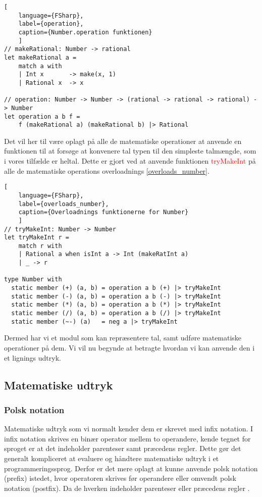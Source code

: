 \begin{lstlisting}[
    language={FSharp},
    label={operation}, 
    caption={Number.operation funktionen}
    ]
// makeRational: Number -> rational
let makeRational a =
    match a with
    | Int x       -> make(x, 1)
    | Rational x  -> x

// operation: Number -> Number -> (rational -> rational -> rational) -> Number
let operation a b f =
    f (makeRational a) (makeRational b) |> Rational
\end{lstlisting}

Det vil her til være oplagt på alle de matematiske operationer at anvende en funktionen til at forsøge at konvenere tal typen til den simpleste talmængde, som i vores tilfælde er heltal. Dette er gjort ved at anvende funktionen \textcolor{red}{tryMakeInt} på alle de matematiske operations overloadnings \ref{overloads_number}.

\begin{lstlisting}[
    language={FSharp},
    label={overloads_number}, 
    caption={Overloadnings funktionerne for Number}
    ]
// tryMakeInt: Number -> Number
let tryMakeInt r =
    match r with
    | Rational a when isInt a -> Int (makeRatInt a)
    | _ -> r
    
type Number with
  static member (+) (a, b) = operation a b (+) |> tryMakeInt
  static member (-) (a, b) = operation a b (-) |> tryMakeInt
  static member (*) (a, b) = operation a b (*) |> tryMakeInt
  static member (/) (a, b) = operation a b (/) |> tryMakeInt
  static member (~-) (a)   = neg a |> tryMakeInt
\end{lstlisting}

Dermed har vi et modul som kan repræsentere tal, samt udføre matematiske operationer på dem. Vi vil nu begynde at betragte hvordan vi kan anvende den i et lignings udtryk.

\subsection{Matematiske udtryk}
\subsubsection{Polsk notation}
Matematiske udtryk som vi normalt kender dem er skrevet med infix notation. I infix notation skrives en binær operator mellem to operandere, kende tegnet for sproget er at det indeholder parenteser samt præcedens regler. Dette gør det generalt kompliceret at evaluere og håndtere matematiske udtryk i et programmeringssprog. Derfor er det mere oplagt at kunne anvende polsk notation (prefix) istedet, hvor operatoren skrives før operandere eller omvendt polsk notation (postfix). Da de hverken indeholder parenteser eller præcedens regler . 

